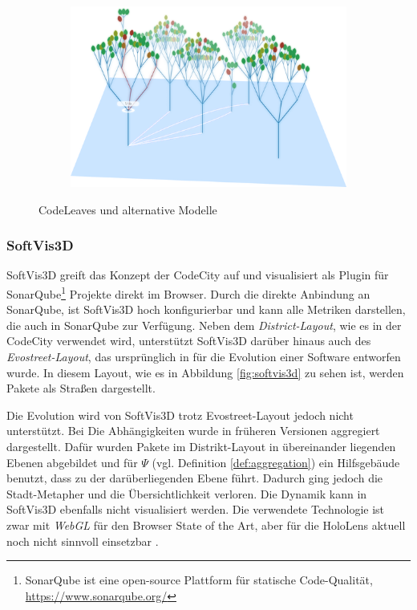 \begin{figure}[htb]
\begin{subfigure}[b]{\fwidth}
  	 \label{fig:code-universe}
  \end{subfigure}
  \hfill
  \begin{subfigure}[b]{\fwidth}
  	\includegraphics[width=\textwidth]{figures/code-leaves}
  	 \label{fig:code-leaves}
  \end{subfigure}
  \caption{CodeLeaves und alternative Modelle} \label{fig:alternatives}
\end{figure}

\subsubsection*{SoftVis3D}
SoftVis3D greift das Konzept der CodeCity auf und visualisiert als Plugin für SonarQube\footnote{SonarQube ist eine open-source Plattform für statische Code-Qualität, \url{https://www.sonarqube.org/}} Projekte direkt im Browser. Durch die direkte Anbindung an SonarQube, ist SoftVis3D hoch konfigurierbar und kann alle Metriken darstellen, die auch in SonarQube zur Verfügung. Neben dem \emph{District-Layout}, wie es in der CodeCity verwendet wird, unterstützt SoftVis3D darüber hinaus auch des \emph{Evostreet-Layout}, das ursprünglich in \cite{steinbruckner2013consistent} für die Evolution einer Software entworfen wurde. In diesem Layout, wie es in Abbildung \ref{fig:softvis3d} zu sehen ist, werden Pakete als Straßen dargestellt.

Die Evolution wird von SoftVis3D trotz Evostreet-Layout jedoch nicht unterstützt. Bei Die Abhängigkeiten wurde in früheren Versionen aggregiert dargestellt. Dafür wurden Pakete im Distrikt-Layout in übereinander liegenden Ebenen abgebildet und für $\Psi$ (vgl. Definition \ref{def:aggregation}) ein Hilfsgebäude benutzt, dass zu der darüberliegenden Ebene führt. Dadurch ging jedoch die Stadt-Metapher und die Übersichtlichkeit verloren. Die Dynamik kann in SoftVis3D ebenfalls nicht visualisiert werden. Die verwendete Technologie ist zwar mit \emph{WebGL} für den Browser State of the Art, aber für die HoloLens aktuell noch nicht sinnvoll einsetzbar \cite{puetz2017softwarevisualisierung}.

